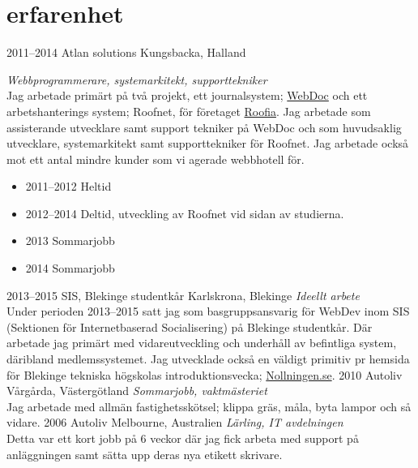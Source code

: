 \documentclass[]{friggeri-cv} %
\begin{document}

\section{erfarenhet}

\begin{entrylist}
\entry
{2011--2014}
{Atlan solutions}
{Kungsbacka, Halland}
{\emph{Webbprogrammerare, systemarkitekt, supporttekniker} \\
Jag arbetade primärt på två projekt, ett journalsystem; \href{http://atlan.se/}{WebDoc} och ett arbetshanterings system; Roofnet, för företaget \href{http://www.roofia.se/}{Roofia}. Jag arbetade som assisterande utvecklare samt support tekniker på WebDoc och som huvudsaklig utvecklare, systemarkitekt samt supporttekniker för Roofnet. Jag arbetade också mot ett antal mindre kunder som vi agerade webbhotell för. \\
\begin{itemize}
	\item 2011--2012 Heltid
	\item 2012--2014 Deltid, utveckling av Roofnet vid sidan av studierna.
	\item 2013 Sommarjobb
	\item 2014 Sommarjobb
\end{itemize}
}
\entry
{2013--2015}
{SIS, Blekinge studentkår}
{Karlskrona, Blekinge}
{\emph{Ideellt arbete} \\
Under perioden 2013--2015 satt jag som basgruppsansvarig för WebDev inom SIS (Sektionen för Internetbaserad Socialisering) på Blekinge studentkår. Där arbetade jag primärt med vidareutveckling och underhåll av befintliga system, däribland medlemssystemet. Jag utvecklade också en väldigt primitiv pr hemsida för Blekinge tekniska högskolas introduktionsvecka; \href{http://www.nollningen.se}{Nollningen.se}. }
\entry
{2010}
{Autoliv}
{Vårgårda, Västergötland}
{\emph{Sommarjobb, vaktmästeriet} \\
	Jag arbetade med allmän fastighetsskötsel; klippa gräs, måla, byta lampor och så vidare.}
\entry
{2006}
{Autoliv}
{Melbourne, Australien}
{\emph{Lärling, IT avdelningen} \\
Detta var ett kort jobb på 6 veckor där jag fick arbeta med support på anläggningen samt sätta upp deras nya etikett skrivare.}
\end{entrylist}
\end{document}

